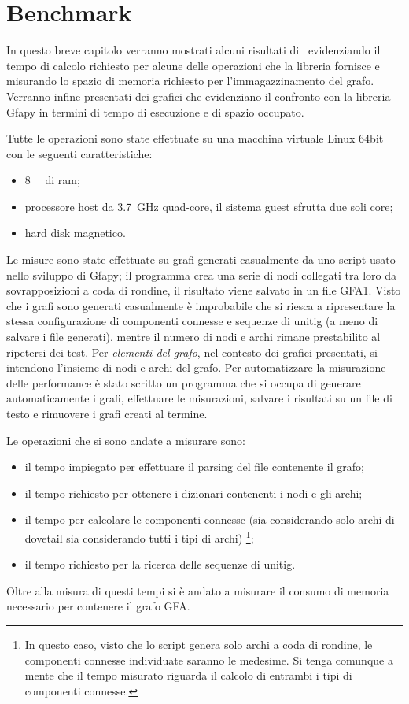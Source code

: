\chapter{Benchmark}
In questo breve capitolo verranno mostrati
alcuni risultati di \pygfa \  evidenziando il tempo di calcolo
richiesto per alcune delle operazioni che la libreria fornisce e misurando
lo spazio di memoria richiesto per l'immagazzinamento del grafo.
Verranno infine presentati dei grafici che evidenziano il
confronto con la libreria Gfapy in termini di tempo di esecuzione
e di spazio occupato.

Tutte le operazioni sono state effettuate su una macchina virtuale
Linux 64bit con le seguenti caratteristiche:
\begin{itemize}
	\item \SI{8}{\giga\byte} di ram;
	\item processore host da \SI{3.7}{\giga\hertz} quad-core, il
		sistema guest sfrutta due soli core;
	\item hard disk magnetico.
\end{itemize}

Le misure sono state effettuate su grafi generati casualmente
da uno script usato nello sviluppo di Gfapy; il programma
crea una serie di nodi collegati tra loro da sovrapposizioni
a coda di rondine, il risultato viene salvato in un file GFA1.
Visto che i grafi sono generati casualmente è improbabile
che si riesca a ripresentare la stessa configurazione di componenti
connesse e sequenze di unitig (a meno di salvare i file generati),
mentre il numero di nodi e archi rimane prestabilito al ripetersi
dei test. Per \emph{elementi del grafo}, nel contesto dei grafici presentati,
si intendono l'insieme di nodi e archi del grafo.
Per automatizzare la misurazione delle performance è stato
scritto un programma che si occupa di generare automaticamente
i grafi, effettuare le misurazioni, salvare i risultati su un file di testo
e rimuovere i grafi creati al termine.

Le operazioni che si sono andate a misurare sono:
\begin{itemize}
	\item il tempo impiegato per effettuare il parsing del file contenente il grafo;
	\item il tempo richiesto per ottenere i dizionari contenenti i nodi e gli archi;
	\item il tempo per calcolare le componenti connesse (sia considerando
		solo archi di dovetail sia considerando tutti i tipi di archi)
		\footnote{In questo caso, visto che lo script genera solo archi a coda
		di rondine, le componenti connesse individuate saranno le medesime. Si tenga
		comunque a mente che il tempo misurato riguarda il calcolo di entrambi
		i tipi di componenti connesse.};
	\item il tempo richiesto per la ricerca delle sequenze di unitig.
\end{itemize}
Oltre alla misura di questi tempi si è andato a misurare il consumo
di memoria necessario per contenere il grafo GFA.
\clearpage

